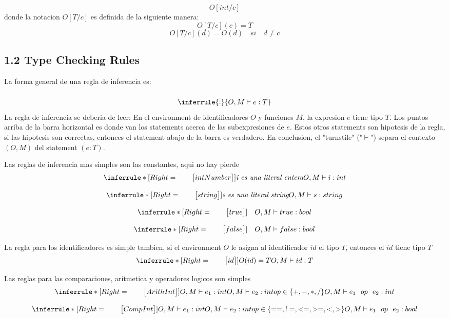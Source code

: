 \documentclass[12pt]{report}
\begin{document}
$$O[int/c]$$
donde la notacion $O[T/c]$ es definida de la siguiente manera:
$$O[T/c](c) = T$$
$$O[T/c](d) = O(d) \quad si \quad d \neq c$$

\subsection*{1.2 Type Checking Rules}
La forma general de una regla de inferencia es:

$$\inferrule{\vdots}{O,M \vdash e:T}$$
La regla de inferencia se deberia de leer: En el environment de identificadores $O$ y funciones $M$, la expresion $e$ tiene tipo $T$. Los puntos arriba de la barra horizontal es donde van los statements acerca de las subexpresiones de $e$. Estos otros statements son hipotesis de la regla, si las hipotesis son correctas, entonces el statement abajo de la barra es verdadero. En conclusion, el "turnstile" ("$\vdash$") separa el contexto $(O,M)$ del statement $(e:T)$.

Las reglas de inferencia mas simples son las constantes, aqui no hay pierde
$$\inferrule* [Right=\quad\quad\big [intNumber\big{]}]{\textit{i es una literal entera}}{O,M \vdash i:int}$$

$$\inferrule* [Right=\quad\quad\big [string\big{]}]{\textit{s es una literal string}}{O,M \vdash s:string}$$

$$\inferrule* [Right=\quad\quad\big [true\big{]}]{\quad}{O,M \vdash true:bool}$$

$$\inferrule* [Right=\quad\quad\big [false\big{]}]{\quad}{O,M \vdash false:bool}$$

La regla para los identificadores es simple tambien, si el environment $O$ le asigna al identificador $id$ el tipo $T$, entonces el $id$ tiene tipo $T$
$$\inferrule* [Right=\quad\quad\big [id\big{]}]{O(id) = T}{O,M \vdash id:T}$$

Las reglas para las comparaciones, aritmetica y operadores logicos son simples
$$\inferrule* [Right=\quad\quad\big [ArithInt\big{]}]{
O,M \vdash e_1 : int \\\\
O,M \vdash e_2 : int \\\\
op \in \{+,-,*,/\}
}{O,M \vdash e_{1}\ \  op\ \  e_{2}: int}$$

$$\inferrule* [Right=\quad\quad\big [CompInt\big{]}]{
O,M \vdash e_1 : int \\\\
O,M \vdash e_2 : int \\\\
op \in \{==,!=,<=,>=,<,>\}
}{O,M \vdash e_{1}\ \  op\ \  e_{2}: bool}$$
\end{document}
